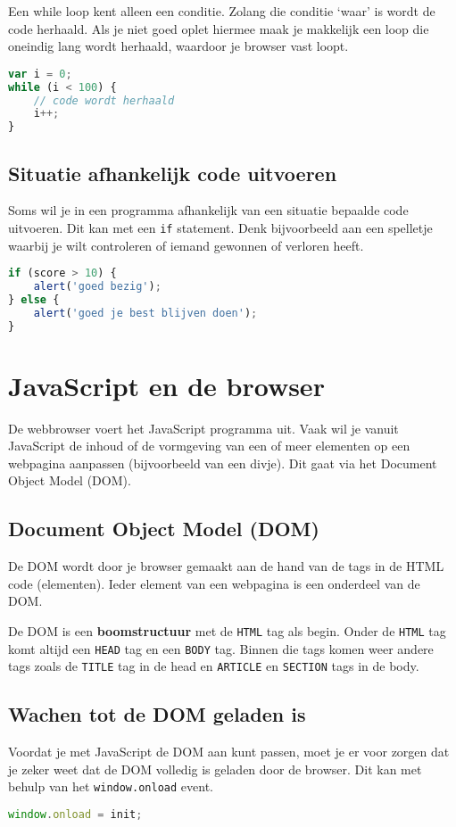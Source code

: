 \documentclass[8pt,pagesize,footinclude=false,headinclude=false]{scrartcl}
\begin{document}
\begin{multicols*}{3}
\noindent Een while loop kent alleen een conditie. Zolang die conditie `waar' is wordt de code herhaald. Als je niet goed oplet hiermee maak je makkelijk een loop die oneindig lang wordt herhaald, waardoor je browser vast loopt.

\begin{lstlisting}[language=JavaScript]
var i = 0;
while (i < 100) {
	// code wordt herhaald
	i++;
}
\end{lstlisting}

\subsection*{Situatie afhankelijk code uitvoeren}
Soms wil je in een programma afhankelijk van een situatie bepaalde code uitvoeren. Dit kan met een \texttt{if} statement. Denk bijvoorbeeld aan een spelletje waarbij je wilt controleren of iemand gewonnen of verloren heeft.
\begin{lstlisting}[language=JavaScript]
if (score > 10) {
	alert('goed bezig');
} else {
	alert('goed je best blijven doen');
}
\end{lstlisting}

\section*{JavaScript en de browser}
De webbrowser voert het JavaScript programma uit. Vaak wil je vanuit JavaScript de inhoud of de vormgeving van een of meer elementen op een webpagina aanpassen (bijvoorbeeld van een divje). Dit gaat via het Document Object Model (DOM).

\subsection*{Document Object Model (DOM)}
De DOM wordt door je browser gemaakt aan de hand van de tags in de HTML code (elementen). Ieder element van een webpagina is een onderdeel van de DOM. 

De DOM is een \textbf{boomstructuur} met de \texttt{HTML} tag als begin. Onder de \texttt{HTML} tag komt altijd een \texttt{HEAD} tag en een \texttt{BODY} tag. Binnen die tags komen weer andere tags zoals de \texttt{TITLE} tag in de head en \texttt{ARTICLE} en \texttt{SECTION} tags in de body. 

\subsection*{Wachen tot de DOM geladen is}
Voordat je met JavaScript de DOM aan kunt passen, moet je er voor zorgen dat je zeker weet dat de DOM volledig is geladen door de browser. Dit kan met behulp van het \texttt{window.onload} event.
\begin{lstlisting}[language=JavaScript]
window.onload = init;


\end{lstlisting}
\end{multicols*}
\end{document}
